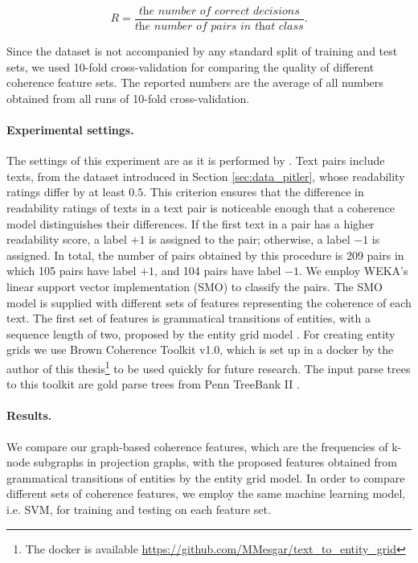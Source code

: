 \begin{equation}
R = \frac{\textit{the number of correct decisions}}{\textit{the number of pairs in that class}}.
\end{equation}

Since the dataset is not accompanied by any standard split of training and test sets, we used 10-fold cross-validation for comparing the quality of different coherence feature sets. 
The reported numbers are the average of all numbers obtained from all runs of \mbox{10-fold} \mbox{cross-validation}. 

\paragraph{Experimental settings.}
The settings of this experiment are as it is performed by . 
Text pairs include texts, from the dataset introduced in Section \ref{sec:data_pitler}, whose readability ratings differ by at least $0.5$. 
This criterion ensures that the difference in readability ratings of texts in a text pair is noticeable enough that a coherence model distinguishes their differences. 
If the first text in a pair has a higher readability score, a label $+1$ is assigned to the pair; otherwise, a label $-1$ is assigned. 
In total, the number of pairs obtained by this procedure is 209 pairs in which 105 pairs have label $+1$, and 104 pairs have label $-1$.  
We employ WEKA's linear support vector implementation (SMO) to classify the pairs.
The SMO model is supplied with different sets of features representing the coherence of each text. 
The first set of features is grammatical transitions of entities, with a sequence length of two, proposed by the entity grid model \cite{barzilay05a,barzilay08}. 
For creating entity grids we use Brown Coherence Toolkit v1.0, which is set up in a docker by the author of this thesis\footnote{The docker is available \url{https://github.com/MMesgar/text_to_entity_grid}} to be used quickly for future research. 
The input parse trees to this toolkit are gold parse trees from Penn TreeBank II \cite{marcus94}. 

\paragraph{Results.}
We compare our graph-based coherence features, which are the frequencies of \mbox{k-node} subgraphs in projection graphs, with the proposed features obtained from grammatical transitions of entities by the entity grid model. 
In order to compare different sets of coherence features, we employ the same machine learning model, i.e. SVM, for training and testing on each feature set. 

